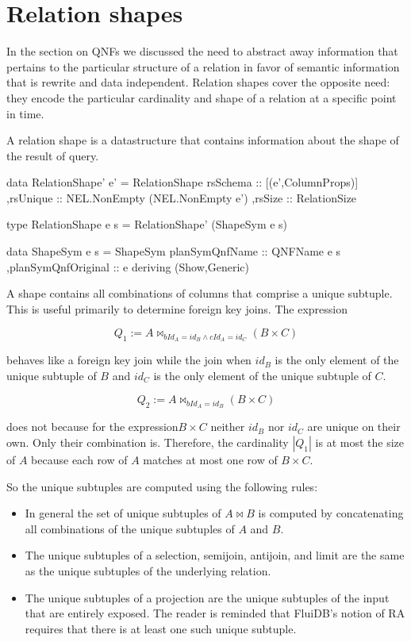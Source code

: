 \section{Relation shapes}
\label{sec:relation_shapes}

In the section on QNFs we discussed the need to abstract away
information that pertains to the particular structure of a relation in
favor of semantic information that is rewrite and data
independent. Relation shapes cover the opposite need: they encode the
particular cardinality and shape of a relation at a specific point in
time.

A relation shape is a datastructure that contains information about
the shape of the result of query.

\begin{haskellcode}
  data RelationShape' e' =
    RelationShape
    { rsSchema :: [(e',ColumnProps)]
      ,rsUnique :: NEL.NonEmpty (NEL.NonEmpty e')
      ,rsSize :: RelationSize
    }

  type RelationShape e s = RelationShape' (ShapeSym e s)

  data ShapeSym e s =
    ShapeSym { planSymQnfName :: QNFName e s
      ,planSymQnfOriginal :: e
    }
    deriving (Show,Generic)
\end{haskellcode}

A shape contains all combinations of columns that comprise a unique
subtuple.  This is useful primarily to determine foreign key
joins. The expression

\[Q_1 := A \Join_{bId_A = id_B \land cId_A = id_C} (B \times C)\]

behaves like a foreign key join while the join when \(id_B\) is the
only element of the unique subtuple of \(B\) and \(id_C\) is the only
element of the unique subtuple of \(C\).

\[Q_2 := A \Join_{bId_A = id_B} (B \times C)\]

does not because for the expression\(B \times C\) neither \(id_B\) nor
\(id_C\) are unique on their own.  Only their combination
is. Therefore, the cardinality \(|Q_1|\) is at most the size of \(A\)
because each row of \(A\) matches at most one row of \(B \times C\).

So the unique subtuples are computed using the following rules:

\begin{itemize}
\item In general the set of unique subtuples of \(A \Join B\) is
  computed by concatenating all combinations of the unique subtuples
  of \(A\) and \(B\).
\item The unique subtuples of a selection, semijoin, antijoin, and limit are the same as the unique
  subtuples of the underlying relation.
\item The unique subtuples of a projection are the unique subtuples of
  the input that are entirely exposed.  The reader is reminded that
  FluiDB's notion of RA requires that there is at least one such
  unique subtuple.
\end{itemize}

